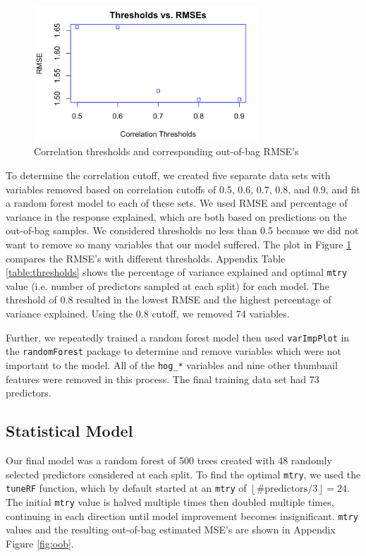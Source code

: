 \documentclass{scrartcl}
\begin{document}
\begin{figure}
    \centering
    \includegraphics[width=0.75\textwidth]{threshold_vs_rmse.png}
    \caption{Correlation thresholds and corresponding out-of-bag RMSE's}
    \label{fig:thresholds}
\end{figure}

To determine the correlation cutoff, we created five separate data sets with variables removed based on correlation cutoffs of 0.5, 0.6, 0.7, 0.8, and 0.9, and fit a random forest model to each of these sets. We used RMSE and percentage of variance in the response explained, which are both based on predictions on the out-of-bag samples. We considered thresholds no less than 0.5 because we did not want to remove so many variables that our model suffered. The plot in Figure \ref{fig:thresholds} compares the RMSE's with different thresholds. Appendix Table \ref{table:thresholds} shows the percentage of variance explained and optimal \verb|mtry| value (i.e. number of predictors sampled at each split) for each model. The threshold of 0.8 resulted in the lowest RMSE and the highest percentage of variance explained. Using the 0.8 cutoff, we removed 74 variables.

Further, we repeatedly trained a random forest model then used \verb|varImpPlot| in the \verb|randomForest| package to determine and remove variables which were not important to the model. All of the \verb|hog_*| variables and nine other thumbnail features were removed in this process. The final training data set had 73 predictors.

\subsection{Statistical Model}

\quad Our final model was a random forest of 500 trees created with 48 randomly selected predictors considered at each split. To find the optimal \verb|mtry|, we used the \verb|tuneRF| function, which by default started at an \verb|mtry| of \(\left\lfloor\textrm{\#predictors}/3\right\rfloor=24\). The initial \verb|mtry| value is halved multiple times then doubled multiple times, continuing in each direction until model improvement becomes insignificant. \verb|mtry| values and the resulting out-of-bag estimated MSE's are shown in Appendix Figure \ref{fig:oob}.
\end{document}
